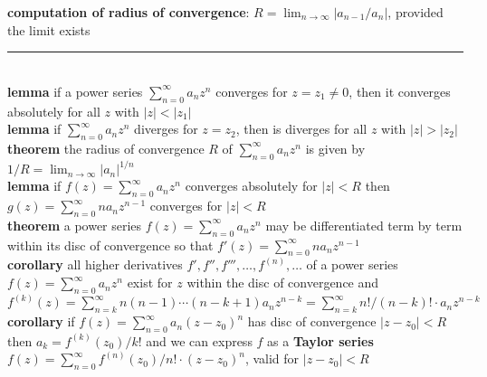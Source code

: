 \documentclass[a4paper]{article}
\newcommand*\abs[1]{\vert #1 \vert}
\newcommand*\linesep[0]{\noindent\rule{\textwidth}{0.5pt}\\}
\begin{document}
\begin{framed}
	\noindent
	\textbf{computation of radius of convergence}: $R = \lim_{n \rightarrow \infty} \abs{a_{n-1} / a_n}$, provided the limit exists\\	
	
	\linesep
	
	\noindent
	\textbf{lemma} if a power series $\sum_{n=0}^\infty a_nz^n$ converges for $z = z_1 \neq 0$, then it converges absolutely for all $z$ with $\abs{z} < \abs{z_1}$\\
	
	\noindent
	\textbf{lemma} if $\sum_{n=0}^\infty a_nz^n$ diverges for $z = z_2$, then is diverges for all $z$ with $\abs{z} > \abs{z_2}$\\
	
	\noindent
	\textbf{theorem} the radius of convergence $R$ of $\sum_{n=0}^\infty a_nz^n$ is given by $1/R = \lim_{n \rightarrow \infty} \abs{a_n}^{1/n}$\\
	
	\noindent
	\textbf{lemma} if $f(z) = \sum_{n=0}^\infty a_nz^n$ converges absolutely for $\abs{z} < R$ then $g(z) = \sum_{n=0}^\infty na_nz^{n-1}$ converges for $\abs{z} < R$\\
	
	\noindent
	\textbf{theorem} a power series $f(z) = \sum_{n=0}^\infty a_nz^n$ may be differentiated term by term within its disc of convergence so that $f'(z) = \sum_{n=0}^\infty na_nz^{n-1}$\\
	
	\noindent
	\textbf{corollary} all higher derivatives $f', f'', f''', \dots, f^{(n)}, \dots$ of a power series $f(z) = \sum_{n=0}^\infty a_nz^n$ exist for $z$ within the disc of convergence and $f^{(k)}(z) = \sum_{n=k}^\infty n(n - 1)\cdots(n - k + 1)a_nz^{n - k} = \sum_{n=k}^\infty n!/(n - k)! \cdot a_nz^{n - k}$\\
	
	\noindent
	\textbf{corollary} if $f(z) = \sum_{n=0}^\infty a_n(z - z_0)^n$ has disc of convergence $\abs{z - z_0} < R$ then $a_k = f^{(k)}(z_0)/k!$ and we can express $f$ as a \textbf{Taylor series} $f(z) = \sum_{n=0}^\infty f^{(n)}(z_0)/n! \cdot (z - z_0)^n$, valid for $\abs{z - z_0} < R$
\end{framed}
\end{document}
